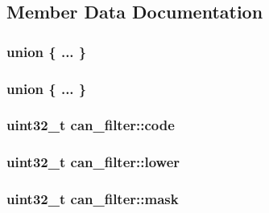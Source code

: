 \subsection{Member Data Documentation}
\subsubsection[{\texorpdfstring{"@7}{@7}}]{\setlength{\rightskip}{0pt plus 5cm}union \{ ... \} }\hypertarget{structcan__filter_a4831e5deb6d6475d8cad3ceae529c51f}{}\label{structcan__filter_a4831e5deb6d6475d8cad3ceae529c51f}
\subsubsection[{\texorpdfstring{"@9}{@9}}]{\setlength{\rightskip}{0pt plus 5cm}union \{ ... \} }\hypertarget{structcan__filter_afbb39bd7340f5fa3ce79d138919840d8}{}\label{structcan__filter_afbb39bd7340f5fa3ce79d138919840d8}
\subsubsection[{\texorpdfstring{code}{code}}]{\setlength{\rightskip}{0pt plus 5cm}uint32\+\_\+t can\+\_\+filter\+::code}\hypertarget{structcan__filter_a33aa98b8a3e04907890496958dcf63da}{}\label{structcan__filter_a33aa98b8a3e04907890496958dcf63da}
\subsubsection[{\texorpdfstring{lower}{lower}}]{\setlength{\rightskip}{0pt plus 5cm}uint32\+\_\+t can\+\_\+filter\+::lower}\hypertarget{structcan__filter_aeb05b2987bb06a96739257032fbeaacd}{}\label{structcan__filter_aeb05b2987bb06a96739257032fbeaacd}
\subsubsection[{\texorpdfstring{mask}{mask}}]{\setlength{\rightskip}{0pt plus 5cm}uint32\+\_\+t can\+\_\+filter\+::mask}\hypertarget{structcan__filter_a15632117f3f031fbbeb28ef562f9ac94}{}\label{structcan__filter_a15632117f3f031fbbeb28ef562f9ac94}
